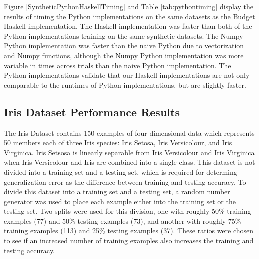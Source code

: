 Figure \ref{SyntheticPythonHaskellTiming} and Table \ref{tab:pythontiming} display the results of timing the Python implementations on the same datasets as the Budget Haskell implementation. The Haskell implementation was faster than both of the Python implementations training on the same synthetic datasets. The Numpy Python implementation was faster than the naive Python due to vectorization and Numpy functions, although the Numpy Python implementation was more variable in times across trials than the naive Python implementation. The Python implementations validate that our Haskell implementations are not only comparable to the runtimes of Python implementations, but are slightly faster.

\subsection{Iris Dataset Performance Results}\label{IrisResults}
The Iris Dataset \cite{Fis36} contains 150 examples of four-dimensional data which represents 50 members each of three Iris species: Iris Setosa, Iris Versicolour, and Iris Virginica. Iris Setsosa is linearly separable from Iris Versicolour and Iris Virginica when Iris Versicolour and Iris are combined into a single class. This dataset is not divided into a training set and a testing set, which is required for determing generalization error as the difference between training and testing accuracy. To divide this dataset into a training set and a testing set, a random number generator was used to place each example either into the training set or the testing set. Two splits were used for this division, one with roughly 50\% training examples (77) and 50\% testing examples (73), and another with roughly 75\% training examples (113) and 25\% testing examples (37). These ratios were chosen to see if an increased number of training examples also increases the training and testing accuracy.

